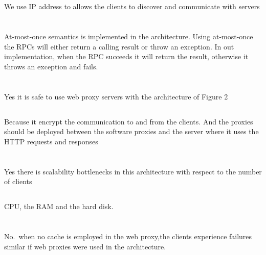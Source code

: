 \documentclass[11pt]{article}
\begin{document}
\subsection{}
We use IP address to allows the clients to discover and communicate with servers

\section{}

At-most-once semantics is implemented in the architecture. Using at-most-once the RPCs will either return a calling result or throw an exception. In out implementation, when the RPC succeeds it will return the result, otherwise it throws an exception and fails.

\section{}
\subsection{}
Yes it is safe to use web proxy servers with the architecture of Figure 2

\subsection{}
Because it encrypt the communication to and from the clients. And the proxies should be deployed between the software proxies and the server where it uses the HTTP requests and responses

\section{}
\subsection{}
Yes there is scalability bottlenecks in this architecture with respect to the number of clients
\subsection{}
CPU, the RAM and the hard disk.

\section{}
\subsection{}
No.\ when no cache is employed in the web proxy,the clients experience failures similar if web proxies were used in the architecture.
\end{document}
